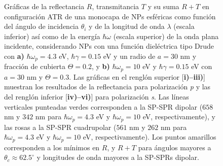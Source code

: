 \begin{figure}[h!]
\begin{subfigure}{.7\linewidth}
		\end{subfigure}\vspace*{-.5em}
	\caption{Gráficas de la reflectancia $R$, transmitancia $T$ y su suma $R+T$ en configuración ATR de una monocapa de NPs esféricas como función del ángulo de incidencia $\theta_i$ y de la longitud de onda $\lambda$ (escala inferior) así como de la energía $\hbar\omega$ (escala superior) de la onda plana incidente, considerando NPs con una función dieléctrica tipo Drude con \textbf{a)} $\hbar\omega_p=4. 3$ eV,  $\hbar\gamma=0. 15$ eV y un radio de $a=30$ nm y fracción de cubierta $\Theta=0.2$, y \textbf{b)} $\hbar\omega_p = 10$ eV y $\hbar\gamma = 0.15$ eV con $a=30$ nm y $\Theta=0.3$.  Las gráficas   en el renglón superior [\textbf{i)--iii)}]  muestran los resultados de la reflectancia para  polarización \emph{p} y las del renglón inferior  [\textbf{iv)--vi)}] para polarización  \emph{s}. Las líneas verticales punteadas verdes corresponden a la SP-SPR dipolar ($658$ nm y $342$ nm para $\hbar\omega_p=4.3$ eV y $\hbar\omega_p = 10$ eV, respectivamente), y las rosas a la SP-SPR cuadrupolar ($561$ nm y $262$ nm para $\hbar\omega_p=4.3$ eV y $\hbar\omega_p = 10$ eV, respectivamente). Los puntos amarillos corresponden a los mínimos en $R$, y $R+T$ para ángulos mayores a $\theta_c\approx 62.5^\circ$ y longitudes de onda mayores a la SP-SPRs dipolar. }\label{fig:RT-Omegas}
	\end{figure}	

